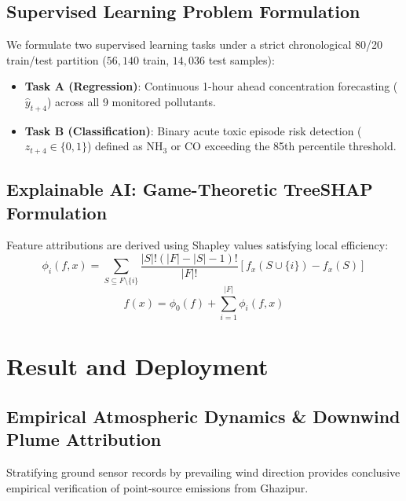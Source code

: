\documentclass[conference]{IEEEtran}
\begin{document}
\subsection{Supervised Learning Problem Formulation}
We formulate two supervised learning tasks under a strict chronological 80/20 train/test partition ($56,140$ train, $14,036$ test samples):
\begin{itemize}
    \item \textbf{Task A (Regression)}: Continuous 1-hour ahead concentration forecasting ($\hat{y}_{t+4}$) across all 9 monitored pollutants.
    \item \textbf{Task B (Classification)}: Binary acute toxic episode risk detection ($z_{t+4} \in \{0, 1\}$) defined as $\text{NH}_3$ or $\text{CO}$ exceeding the 85th percentile threshold.
\end{itemize}

\subsection{Explainable AI: Game-Theoretic TreeSHAP Formulation}
Feature attributions are derived using Shapley values satisfying local efficiency:
\begin{equation}
\phi_i(f, x) = \sum_{S \subseteq F \setminus \{i\}} \frac{|S|!(|F| - |S| - 1)!}{|F|!} \left[ f_x(S \cup \{i\}) - f_x(S) \right]
\end{equation}
\begin{equation}
f(x) = \phi_0(f) + \sum_{i=1}^{|F|} \phi_i(f, x)
\end{equation}

\section{Result and Deployment}
\subsection{Empirical Atmospheric Dynamics \& Downwind Plume Attribution}
Stratifying ground sensor records by prevailing wind direction provides conclusive empirical verification of point-source emissions from Ghazipur.
\end{document}
